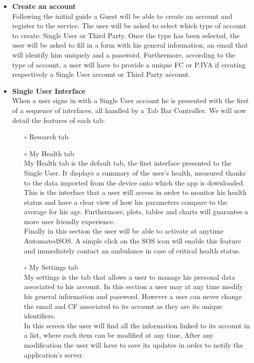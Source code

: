 \documentclass[titlepage]{article}
\begin{document}
\begin{itemize}
\begin{itemize}
				\item{\bf Create an account}\\
				Following the initial guide a Guest will be able to create an account and register to the service. The user will be asked to select which type of account to create: Single User or Third Party. Once the type has been selected, the user will be asked to fill in a form with his general information, an email that will identify him uniquely and a password. Furthermore, according to the type of account, a user will have to provide a unique FC or P.IVA if creating respectively a Single User account or Third Party account.\\

				\item{\bf Single User Interface} \\
			When a user signs in with a Single User account he is presented with the first of a sequence of interfaces, all handled by a Tab Bar Controller. We will now detail the features of each tab:
				\begin{itemize}
					\item[$\circ$] Research tab
					\item[$\circ$] My Health tab\\
				My Health tab is the default tab, the first interface presented to the Single User. It displays a summary of the user’s health, measured thanks to the data imported from the device onto which the app is downloaded. This is the interface that a user will access in order to monitor his health status and have a clear view of how his parameters compare to the average for his age. Furthermore, plots, tables and charts will guarantee a more user friendly experience.\\
Finally in this section the user will be able to activate at anytime AutomatedSOS. A simple click on the SOS icon will enable this feature and immediately contact an ambulance in case of critical health status.

					\item[$\circ$] My Settings tab \\
				My settings is the tab that allows a user to manage his personal data associated to his account. In this section a user may at any time modify his general information and password. However a user can never change the email and CF associated to its account as they are its unique identifiers.\\
In this screen the user will find all the information linked to its account in a list, where each item can be modified at any time. After any modification the user will have to save its updates in order to notify the application’s server.


\end{itemize}
\end{itemize}
\end{itemize}
\end{document}
